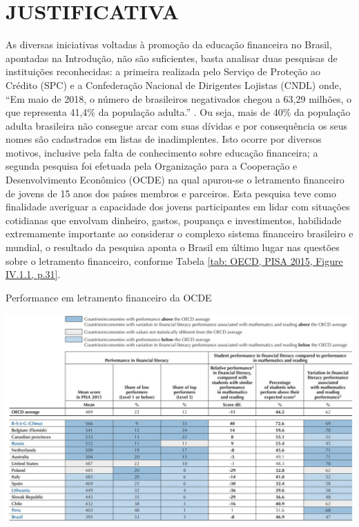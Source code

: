 \section{JUSTIFICATIVA}
As diversas iniciativas voltadas à promoção da educação financeira no Brasil, apontadas na Introdução, não são suficientes, basta analisar duas pesquisas de instituições reconhecidas: a primeira realizada pelo Serviço de Proteção ao Crédito (SPC) e a Confederação Nacional de Dirigentes Lojistas (CNDL) onde, “Em maio de 2018, o número de brasileiros negativados chegou a 63,29 milhões, o que representa 41,4\% da população adulta.” \cite{spc2018}. Ou seja,  mais de 40\% da população adulta brasileira não consegue arcar com suas dívidas e por consequência os seus nomes são cadastrados em listas de inadimplentes. Isto ocorre por diversos motivos, inclusive pela falta de conhecimento sobre educação financeira; a segunda pesquisa foi efetuada pela Organização para a Cooperação e Desenvolvimento Econômico (OCDE) na qual apurou-se o letramento financeiro de jovens de 15 anos dos países membros e parceiros. Esta pesquisa teve como finalidade  averiguar a capacidade dos jovens participantes em lidar com situações cotidianas que envolvam dinheiro, gastos, poupança e investimentos, habilidade extremamente importante ao considerar o complexo sistema financeiro brasileiro e mundial, o resultado da pesquisa aponta o Brasil em último lugar nas questões sobre o letramento financeiro, conforme Tabela \ref{tab: OECD, PISA 2015, Figure IV.1.1, p.31}.

\graphicspath{{tabelas/}}
\begin{table}[!ht]
\centering
\begin{minipage}{1.\textwidth}
\caption{Performance em letramento financeiro da OCDE}
\centering
\includegraphics[width=1.0\textwidth]{tabela01-pisa2015.jpg}
\label{tab: OECD, PISA 2015, Figure IV.1.1, p.31}
\end{minipage}
\end{table}

